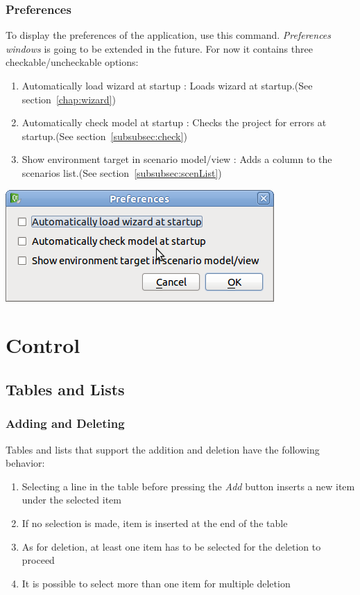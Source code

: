 \documentclass[a4paper,11pt]{report}
\begin{document}
\subsubsection{Preferences}
\label{subsubsec:Pref}
To display the preferences of the application, use this command. \emph{Preferences windows} is going to be extended in the future. For now it contains three checkable/uncheckable options:
\begin{enumerate}
\item{Automatically load wizard at startup :} Loads wizard at startup.(See section~\ref{chap:wizard})
\item{Automatically check model at startup :} Checks the project for errors at startup.(See section~\ref{subsubsec:check})
\item{Show environment target in scenario model/view : } Adds a column to the scenarios list.(See section~\ref{subsubsec:scenList}) 
\end{enumerate}
\begin{center}
\includegraphics[scale=0.3]{Pictures/Menu/Preferences.png}
\label{fig:preferences}
\end{center}

\section{Control}
\subsection{Tables and Lists}
\label{subsec:TabAndList}
\subsubsection{Adding and Deleting}
Tables and lists that support the addition and deletion have the following behavior:
\begin{enumerate}
\item{Selecting a line in the table before pressing the \emph{Add} button inserts a new item under the selected item}
\item{If no selection is made, item is inserted at the end of the table} 
\item{As for deletion, at least one item has to be selected for the deletion to proceed} 
\item{It is possible to select more than one item for multiple deletion} 
\end{enumerate}
\end{document}
